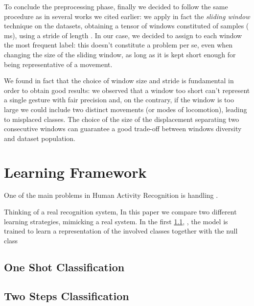 To conclude the preprocessing phase, finally we decided to follow the same procedure as in several works we cited earlier: we apply in fact the \textit{sliding window} technique on the datasets, obtaining a tensor of windows constituted of  samples ( ms), using a stride of length . In our case, we decided to assign to each window the most frequent label: this doesn't constitute a problem per se, even when changing the size of the sliding window, as long as it is kept short enough for being representative of a movement.

We found in fact that the choice of window size and stride is fundamental in order to obtain good results: we observed that a window too short can't represent a single gesture with fair precision and, on the contrary, if the window is too large we could include two distinct movements (or modes of locomotion), leading to misplaced classes. The choice of the size of the displacement separating two consecutive windows can guarantee a good trade-off between windows diversity and dataset population.

\section{Learning Framework}
\label{sec:learning_framework}


One of the main problems in Human Activity Recognition is handling .

Thinking of a real recognition system, 
In this paper we compare two different learning strategies, mimicking a real system. In the first \ref{sub:oneshot}, , the model is trained to learn a representation of the involved classes together with the null class

\subsection{One Shot Classification}
\label{sub:oneshot}

\subsection{Two Steps Classification}
\label{sub:twosteps}
